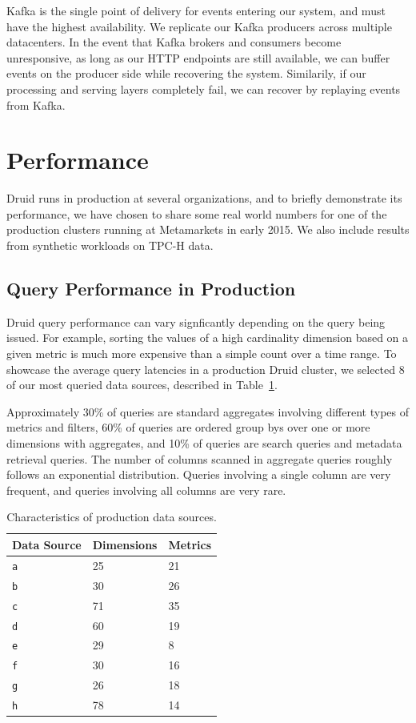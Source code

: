 \documentclass{vldb}
\begin{document}
{Kafka is the single point of delivery for events entering our system, and must
have the highest availability. We replicate our Kafka producers across multiple
datacenters. In the event that Kafka brokers and consumers become unresponsive,
as long as our HTTP endpoints are still available, we can buffer events on the
producer side while recovering the system. Similarily, if our processing and
serving layers completely fail, we can recover by replaying events from Kafka.

\section{Performance}
\label{sec:performance}
Druid runs in production at several organizations, and to briefly demonstrate
its performance, we have chosen to share some real world numbers for one of the
production clusters running at Metamarkets in early 2015. We also include
results from synthetic workloads on TPC-H data.

\subsection{Query Performance in Production}
Druid query performance can vary signficantly depending on the query being
issued. For example, sorting the values of a high cardinality dimension based
on a given metric is much more expensive than a simple count over a time range.
To showcase the average query latencies in a production Druid cluster, we
selected 8 of our most queried data sources, described in
Table~\ref{tab:datasources}.

Approximately 30\% of queries are standard aggregates involving different types
of metrics and filters, 60\% of queries are ordered group bys over one or more
dimensions with aggregates, and 10\% of queries are search queries and metadata
retrieval queries. The number of columns scanned in aggregate queries roughly
follows an exponential distribution. Queries involving a single column are very
frequent, and queries involving all columns are very rare.

\begin{table}
  \centering
  \scriptsize\begin{tabular}{| l | l | l |}
    \hline
    \textbf{Data Source} & \textbf{Dimensions} & \textbf{Metrics} \\ \hline
    \texttt{a} & 25 & 21 \\ \hline
    \texttt{b} & 30 & 26 \\ \hline
    \texttt{c} & 71 & 35 \\ \hline
    \texttt{d} & 60 & 19 \\ \hline
    \texttt{e} & 29 & 8 \\ \hline
    \texttt{f} & 30 & 16 \\ \hline
    \texttt{g} & 26 & 18 \\ \hline
    \texttt{h} & 78 & 14 \\ \hline
  \end{tabular}
  \normalsize
  \caption{Characteristics of production data sources.}
  \label{tab:datasources}
\end{table}

}
\end{document}
